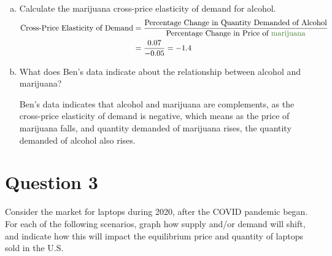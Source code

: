 \documentclass{article}
\newcommand{\question}[1]{\pagebreak\section{Question #1}}
\begin{document}
\begin{enumerate}[(a)]
    \item Calculate the \textcolor{OliveGreen}{marijuana} cross-price elasticity of demand for alcohol.
    \begin{align*}
        \text{Cross-Price Elasticity of Demand} &= \frac{\text{Percentage Change in Quantity Demanded of Alcohol}}{\text{Percentage Change in Price of \textcolor{OliveGreen}{marijuana}}}\\
         &= \frac{0.07}{-0.05} = -1.4
    \end{align*}
    \item What does Ben's data indicate about the relationship between alcohol and \textcolor{OliveGreen}{marijuana}?
    
    Ben's data indicates that alcohol and \textcolor{OliveGreen}{marijuana} are complements, as the cross-price elasticity of demand is negative, which means as the price of \textcolor{OliveGreen}{marijuana} falls, and quantity demanded of \textcolor{OliveGreen}{marijuana} rises, the quantity demanded of alcohol also rises.
\end{enumerate}

\pagebreak

\question{3}

Consider the market for laptops during 2020, after the COVID pandemic began. For each of the following scenarios, graph how supply and/or demand will shift, and indicate how this will impact the equilibrium price and quantity of laptops sold in the U.S.
\end{document}
